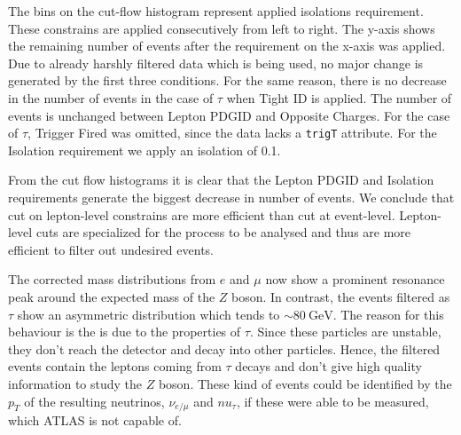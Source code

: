 \documentclass[11 pt]{article}
\begin{document}
The bins on the cut-flow histogram represent applied isolations requirement. These constrains are applied consecutively from left to right. The y-axis shows the remaining number of events after the requirement on the x-axis was applied. Due to already harshly filtered data which is being used, no major change is generated by the first three conditions. For the same reason, there is no decrease in the number of events in the case of $\tau$ when Tight ID is applied. The number of events is unchanged between Lepton PDGID and Opposite Charges. For the case of $\tau$, Trigger Fired was omitted, since the data lacks a \texttt{trigT} attribute. For the Isolation requirement we apply an isolation of 0.1. 

From the cut flow histograms it is clear that the Lepton PDGID and Isolation requirements generate the biggest decrease in number of events. We conclude that cut on lepton-level constrains are more efficient than cut at event-level. Lepton-level cuts are specialized for the process to be analysed and thus are more efficient to filter out undesired events. 

The corrected mass distributions from $e$ and $\mu$ now show a prominent resonance peak around the expected mass of the $Z$ boson. In contrast, the events filtered as $\tau$ show an asymmetric distribution which tends to $\sim\SI{80}{\giga\electronvolt}$. The reason for this behaviour is the is due to the properties of $\tau$. Since these particles are unstable, they don't reach the detector and decay into other particles. Hence, the filtered events contain the leptons coming from $\tau$ decays and don't give high quality information to study the $Z$ boson. These kind of events could be identified by the $p_T$ of the resulting neutrinos, $\nu_{e/\mu}$ and $nu_\tau$, if these were able to be measured, which ATLAS is not capable of. 
\end{document}
